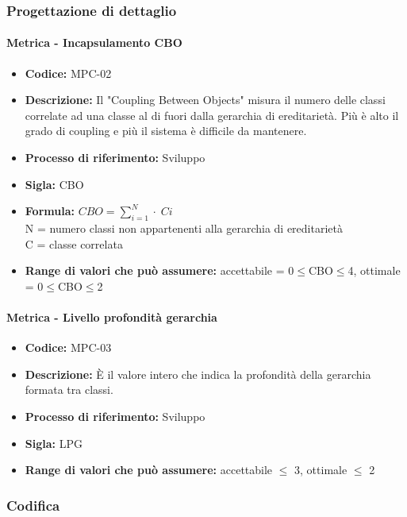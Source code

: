 \subsubsection{Progettazione di dettaglio}
    \paragraph{Metrica - Incapsulamento CBO}
    \begin{itemize}
        \item \textbf{Codice:} MPC-02
        \item \textbf{Descrizione:} Il "Coupling Between Objects" misura il numero delle classi correlate ad una classe al di fuori dalla gerarchia di ereditarietà. Più è alto il grado di coupling e più il sistema è difficile da mantenere.
        \item \textbf{Processo di riferimento:} Sviluppo
        \item \textbf{Sigla:} CBO
        \item \textbf{Formula:} \begin{math}{CBO = {\sum_{i=1}^{N} \cdot \; Ci}}\end{math} \\ N = numero classi non appartenenti alla gerarchia di ereditarietà \\ C = classe correlata
        \item \textbf{Range di valori che può assumere:} accettabile = 0$\leq$CBO$\leq$4, ottimale = 0$\leq$CBO$\leq$2
    \end{itemize}

    \paragraph{Metrica - Livello profondità gerarchia}
    \begin{itemize}
        \item \textbf{Codice:} MPC-03
        \item \textbf{Descrizione:} È il valore intero che indica la profondità della gerarchia formata tra classi.
        \item \textbf{Processo di riferimento:} Sviluppo
        \item \textbf{Sigla:} LPG
        \item \textbf{Range di valori che può assumere:} accettabile $\leq$ 3, ottimale $\leq$ 2
    \end{itemize}

\subsubsection{Codifica}  
